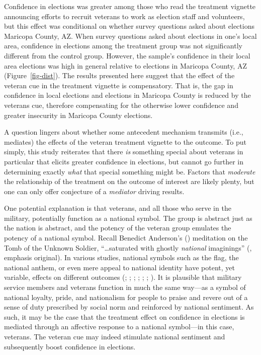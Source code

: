 \documentclass[
  12pt,
  letterpaper,
]{article}
\begin{document}
Confidence in elections was greater among those who read the treatment
vignette announcing efforts to recruit veterans to work as election
staff and volunteers, but this effect was conditional on whether survey
questions asked about elections Maricopa County, AZ. When survey
questions asked about elections in one's local area, confidence in
elections among the treatment group was not significantly different from
the control group. However, the sample's confidence in their local area
elections was high in general relative to elections in Maricopa County,
AZ (Figure~\ref{fig-dist}). The results presented here suggest that the
effect of the veteran cue in the treatment vignette is compensatory.
That is, the gap in confidence in local elections and elections in
Maricopa County is reduced by the veterans cue, therefore compensating
for the otherwise lower confidence and greater insecurity in Maricopa
County elections.

A question lingers about whether some antecedent mechanism transmits
(i.e., mediates) the effects of the veteran treatment vignette to the
outcome. To put simply, this study reiterates that there \emph{is}
something special about veterans in particular that elicits greater
confidence in elections, but cannot go further in determining exactly
\emph{what} that special something might be. Factors that
\emph{moderate} the relationship of the treatment on the outcome of
interest are likely plenty, but one can only offer conjecture of a
\emph{mediator} driving results.

One potential explanation is that veterans, and all those who serve in
the military, potentially function as a national symbol. The group is
abstract just as the nation is abstract, and the potency of the veteran
group emulates the potency of a national symbol. Recall Benedict
Anderson's () meditation on the Tomb of
the Unknown Soldier, ``\ldots saturated with ghostly \emph{national}
imaginings'' (, emphasis original).
In various studies, national symbols such as the flag, the national
anthem, or even mere appeal to national identity have potent, yet
variable, effects on different outcomes (; ;
;
;
;
;
). It is plausible that
military service members and veterans function in much the same way---as
a symbol of national loyalty, pride, and nationalism for people to
praise and revere out of a sense of duty prescribed by social norm and
reinforced by national sentiment. As such, it may be the case that the
treatment effect on confidence in elections is mediated through an
affective response to a national symbol---in this case, veterans. The
veteran cue may indeed stimulate national sentiment and subsequently
boost confidence in elections.
\end{document}
